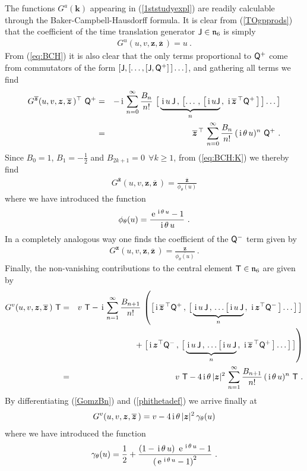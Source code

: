 \documentclass[11pt,a4paper]{article}
\newcommand{\ii}{{\rm i}}
\newcommand{\mbf}[1]{{\boldsymbol {#1} }}
\def\ii{{\,{\rm i}\,}}
\def\T{{\sf T}}
\def\Q{{\sf Q}}
\def\J{{\sf J}}
\def\mz{{\mbf z}}
\def\mk{{\mbf k}}
\def\mfn{{\mathfrak n}}
\def\e{{\,\rm e}\,}
\def\bea{\begin{eqnarray}}
\def\eea{\end{eqnarray}}
\newcommand{\beq}{\begin{eqnarray}}
\newcommand{\eeq}{\end{eqnarray}}
\begin{document}
The functions $G^a(\mk)$ appearing in (\ref{1ststudyexpl}) are readily
calculable through the Baker-Campbell-Hausdorff formula. It is clear
from (\ref{TOgpprods}) that the coefficient of the time translation
generator $\J\in\mfn_6$ is simply
\beq
G^u(u,v,\mz,\overline{\mz}\,)=u \ .
\label{Gj}\eeq
From (\ref{eq:BCH}) it is also clear that the only terms proportional
to $\Q^+$ come from commutators of the form
$[\J,[\dots,[\J,\Q^+]\,]\dots]$, and gathering all terms we find
\bea
G^{\overline{\mz}}(u,v,\mz,\overline{\mz}\,)^\top~\Q^+&=&-\ii\sum_{n=0}^\infty
\frac{B_n}{n!}~\bigl[\,\underbrace{\ii u\,\J\,,\,\bigl[\dots\,,\,
\bigl[\ii u\J}_n\,,\,\ii\overline{\mz}^{\,\top}\Q^+\,\bigr]\,\bigr]
\dots\bigr]\nonumber\\&=&
\overline{\mz}^{\,\top}\,\sum_{n=0}^\infty\frac{B_n}{n!}\,
(\ii\theta\,u)^n~\Q^+ \ .
\label{GomzBn}\eea
Since $B_0=1$, $B_1=-\frac12$ and $B_{2k+1}=0~~\forall k\geq1$, from
(\ref{eq:BCH:K}) we thereby find
\beq
G^{\overline{\mz}}(u,v,\mz,\overline{\mz}\,)=\frac{\overline{\mz}}
{\phi_\theta(u)}
\label{Gomz}\eeq
where we have introduced the function
\beq
\phi_\theta(u)=\frac{\e^{\ii\theta\,u}-1}{\ii\theta\,u} \ .
\label{phithetadef}\eeq
In a completely analogous way one finds the coefficient of the $\Q^-$
term given by
\beq
G^{{\mz}}(u,v,\mz,\overline{\mz}\,)=\frac{{\mz}}
{\overline{\phi_\theta(u)}} \ .
\label{Gmz}\eeq
Finally, the non-vanishing contributions to the central
element $\T\in\mfn_6$ are given by
\bea
G^v(u,v,\mz,\overline{\mz}\,)~\T&=&
v~\T-\ii\sum_{n=1}^\infty\frac{B_{n+1}}{n!}\,
\left(\bigl[\ii\overline{\mz}^{\,\top}\Q^+\,,\,\bigl[\,
\underbrace{\ii u\,\J\,,\,\dots\bigl[\ii u\,\J}_n\,,\,\ii\mz^\top
\Q^-\,\bigr]\dots\bigr]\,\bigr]\right.\nonumber\\&&\qquad\qquad\qquad
+\left.\bigl[\ii\mz^\top\Q^-\,,\,\bigl[\,
\underbrace{\ii u\,\J\,,\,\dots\bigl[\ii u\,\J}_n\,,\,
\ii\overline{\mz}^{\,\top}\Q^+\,\bigr]\dots\bigr]\,\bigr]\right)
\nonumber\\&=&v~\T-4\ii\theta\,|\mz|^2\,\sum_{n=1}^\infty\frac{B_{n+1}}
{n!}\,(\ii\theta\,u)^n~\T \ .
\label{GtBn}\eea
By differentiating (\ref{GomzBn}) and (\ref{phithetadef}) we arrive
finally at
\beq
G^v(u,v,\mz,\overline{\mz}\,)=v-4\ii\theta\,|\mz|^2\,
\gamma_\theta(u)
\label{Gt}\eeq
where we have introduced the function
\beq
\gamma_\theta(u)=\frac12+\frac{(1-\ii\theta\,u)~\e^{\ii\theta\,u}-1}
{\left(\e^{\ii\theta\,u}-1\right)^2} \ .
\label{gammathetadef}\eeq
\end{document}
